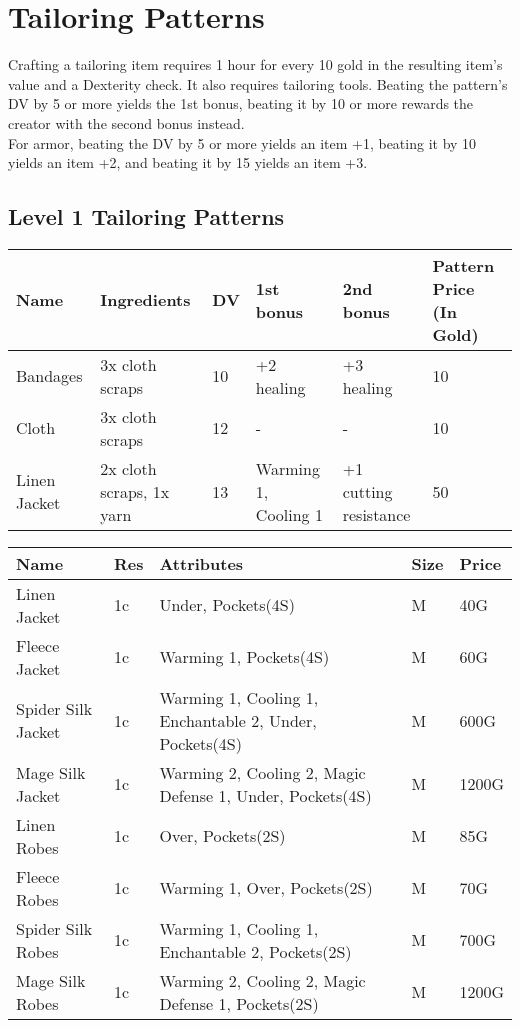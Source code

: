 \section{Tailoring Patterns}\label{sec:tailoringPatterns}
Crafting a tailoring item requires 1 hour for every 10 gold in the resulting item's value and a Dexterity check.
It also requires tailoring tools.
Beating the pattern's DV by 5 or more yields the 1st bonus, beating it by 10 or more rewards the creator with the second bonus instead.\\
For armor, beating the DV by 5 or more yields an item +1, beating it by 10 yields an item +2, and beating it by 15 yields an item +3.\\
	
\subsection{Level 1 Tailoring Patterns}
\begin{longtable}{p{1.5cm} | p{2.5cm} | l | p{2cm} | p{2cm} | p{1cm} }
	Name & Ingredients & DV  & 1st bonus & 2nd bonus & Pattern Price (In Gold)\\ \hline
	Bandages & 3x cloth scraps & 10 & +2 healing & +3 healing & 10\\
	Cloth & 3x cloth scraps & 12 & - & - & 10\\
	Linen Jacket & 2x cloth scraps, 1x yarn & 13 & Warming 1, Cooling 1 & +1 cutting resistance & 50\\
\end{longtable}

\begin{longtable}{p{3cm} | p{1.5cm} | p{5cm} | p{1cm} | p{1.5cm}}
	Name & Res &   Attributes & Size & Price\\ \hline

	Linen Jacket & 1c & Under, Pockets(4S) & M & 40G\\

	Fleece Jacket & 1c & Warming 1, Pockets(4S) & M & 60G\\

	Spider Silk Jacket & 1c & Warming 1, Cooling 1, Enchantable 2, Under, Pockets(4S) & M & 600G\\

	Mage Silk Jacket & 1c & Warming 2, Cooling 2, Magic Defense 1, Under, Pockets(4S) & M & 1200G\\

	Linen Robes & 1c & Over, Pockets(2S) & M & 85G\\

	Fleece Robes & 1c & Warming 1, Over, Pockets(2S)  & M & 70G\\

	Spider Silk Robes & 1c & Warming 1, Cooling 1, Enchantable 2, Pockets(2S)  & M & 700G\\

	Mage Silk Robes & 1c & Warming 2, Cooling 2, Magic Defense 1, Pockets(2S)  & M & 1200G\\
\end{longtable}

